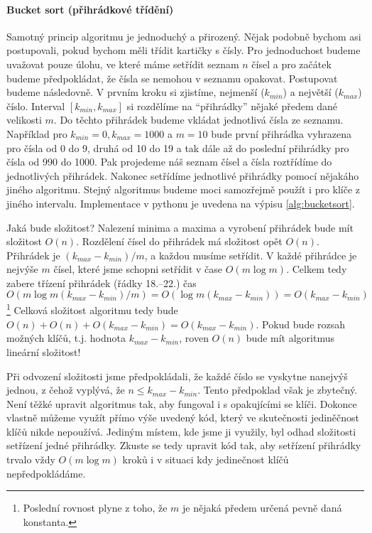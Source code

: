 \paragraph{Bucket sort (přihrádkové třídění)}
Samotný princip algoritmu je jednoduchý a přirozený. Nějak podobně bychom asi postupovali, pokud bychom měli třídit kartičky s čísly. 
Pro jednoduchost budeme uvažovat pouze úlohu,
ve které máme setřídit seznam $n$ čísel a pro začátek budeme předpokládat, že čísla se nemohou v seznamu opakovat. Postupovat budeme následovně. V prvním kroku si zjistíme, nejmenší ($k_{min}$) a největší ($k_{max}$) číslo. Interval $[k_{min},k_{max}]$ si rozdělíme na ``přihrádky'' nějaké předem dané velikosti $m$. Do těchto přihrádek budeme vkládat jednotlivá čísla ze seznamu. Například pro $k_{min}=0,k_{max}=1000$ a $m=10$ bude první přihrádka vyhrazena pro čísla od 0 do 9, druhá od 10 do 19 a tak dále
až do poslední přihrádky pro čísla od 990 do 1000.
Pak projedeme náš seznam čísel a čísla roztřídíme do jednotlivých přihrádek.
Nakonec setřídíme jednotlivé přihrádky pomocí nějakáho jiného algoritmu.
Stejný algoritmus budeme moci samozřejmě použít i pro klíče z jiného intervalu.
Implementace v pythonu je uvedena na výpisu \ref{alg:bucketsort}.


Jaká bude složitost? Nalezení minima a maxima a vyrobení přihrádek bude mít složitost $O(n)$. Rozdělení čísel do přihrádek má složitost opět $O(n)$.
Přihrádek je $(k_{max}-k_{min})/m$, a každou musíme setřídit.  V každé přihrádce je
nejvýše $m$ čísel, které jsme schopni setřídit v čase $O(m\log m)$. Celkem tedy
zabere třízení přihrádek (řádky 18.--22.) čas $O( m\log m(k_{max}-k_{min})/m) = O(\log m(k_{max}-k_{min})) = O(k_{max}-k_{min})$\footnote{Poslední rovnost plyne z toho, že $m$ je nějaká předem určená pevně daná konstanta.} Celková složitost algoritmu tedy bude $O(n)+O(n) + O(k_{max}-k_{min}) = O(k_{max}-k_{min})$. Pokud bude rozsah
možných klíčů, t.j. hodnota  $k_{max}-k_{min}$, roven $O(n)$ bude mít algoritmus
lineární složitost!

\begin{cviceni}
Při odvození složitosti jsme předpokládali, že každé číslo se vyskytne nanejvýš jednou, z čehož vyplývá, že $n\leq k_{max}-k_{min}$. Tento předpoklad však
je zbytečný. Není těžké upravit algoritmus tak, aby fungoval i s opakujícími se klíči.
Dokonce vlastně můžeme využít přímo výše uvedený kód, který ve skutečnosti jediněčnost klíčů nikde nepoužívá. Jediným místem, kde jsme ji využily, byl odhad složitosti setřízení jedné přihrádky. Zkuste se tedy
upravit kód tak, aby setřízení přihrádky trvalo vždy $O(m\log m)$ kroků i v situaci
kdy jedinečnost klíčů nepředpokládáme.
\end{cviceni}


